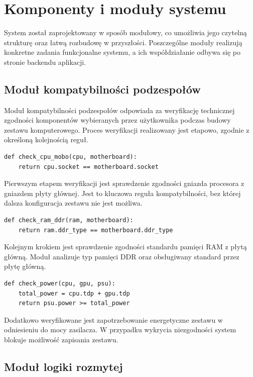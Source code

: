 \documentclass[a4paper,twoside,12pt]{book}
\begin{document}

\section{Komponenty i moduły systemu}

System został zaprojektowany w sposób modułowy, co umożliwia jego czytelną
strukturę oraz łatwą rozbudowę w przyszłości. Poszczególne moduły realizują
konkretne zadania funkcjonalne systemu, a ich współdziałanie odbywa się
po stronie backendu aplikacji.

\subsection{Moduł kompatybilności podzespołów}

Moduł kompatybilności podzespołów odpowiada za weryfikację technicznej zgodności
komponentów wybieranych przez użytkownika podczas budowy zestawu komputerowego.
Proces weryfikacji realizowany jest etapowo, zgodnie z określoną kolejnością
reguł.

\begin{verbatim}
def check_cpu_mobo(cpu, motherboard):
    return cpu.socket == motherboard.socket
\end{verbatim}

Pierwszym etapem weryfikacji jest sprawdzenie zgodności gniazda procesora z
gniazdem płyty głównej. Jest to kluczowa reguła kompatybilności, bez której dalsza
konfiguracja zestawu nie jest możliwa.

\begin{verbatim}
def check_ram_ddr(ram, motherboard):
    return ram.ddr_type == motherboard.ddr_type
\end{verbatim}

Kolejnym krokiem jest sprawdzenie zgodności standardu pamięci RAM z płytą główną.
Moduł analizuje typ pamięci DDR oraz obsługiwany standard przez płytę główną.

\begin{verbatim}
def check_power(cpu, gpu, psu):
    total_power = cpu.tdp + gpu.tdp
    return psu.power >= total_power
\end{verbatim}

Dodatkowo weryfikowane jest zapotrzebowanie energetyczne zestawu w odniesieniu do
mocy zasilacza. W przypadku wykrycia niezgodności system blokuje możliwość
zapisania zestawu.

\subsection{Moduł logiki rozmytej}
\end{document}
